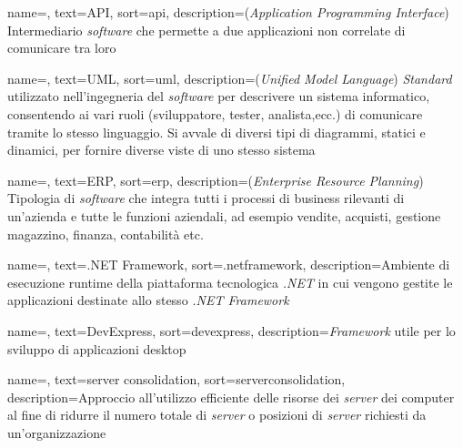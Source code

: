 
%

{
    name=,
    text=API,
    sort=api,
    description={(\emph{Application Programming Interface})
    Intermediario \textit{software} che permette a due
    applicazioni non correlate di comunicare tra loro}
}

{
    name=,
    text=UML,
    sort=uml,
    description={(\emph{Unified Model Language})
    \textit{Standard} utilizzato nell'ingegneria del \textit{software}
    per descrivere un sistema informatico, consentendo ai
    vari ruoli (sviluppatore, tester, analista,ecc.) di
    comunicare tramite lo stesso linguaggio. Si avvale di
    diversi tipi di diagrammi, statici e dinamici,
    per fornire diverse viste di uno stesso sistema \cite{site:def-uml}}
}

{
    name=,
    text=ERP,
    sort=erp,
    description={(\emph{Enterprise Resource Planning})
    Tipologia di \textit{software} che integra tutti i processi
    di business rilevanti di un'azienda e tutte le funzioni
    aziendali, ad esempio vendite, acquisti, gestione magazzino,
    finanza, contabilità etc. \cite{site:wiki}}
}

{
    name=,
    text=.NET Framework,
    sort=.netframework,
    description={Ambiente di esecuzione runtime
    della piattaforma tecnologica \textit{.NET} in cui
    vengono gestite le applicazioni destinate allo stesso
    \textit{.NET Framework} \cite{site:wiki}}
}

{
    name=,
    text=DevExpress,
    sort=devexpress,
    description={\textit{Framework} utile per lo sviluppo
    di applicazioni desktop \cite{site:devexpress-docs}}
}

{
    name=,
    text=server consolidation,
    sort=serverconsolidation,
    description={Approccio all'utilizzo efficiente
    delle risorse dei \textit{server} dei computer al fine di
    ridurre il numero totale di \textit{server} o posizioni di
    \textit{server} richiesti da un'organizzazione \cite{site:def-server-cons}}
}


